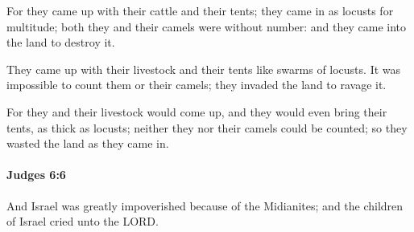 			\begin{versebox}
					\item[BHS] 
					\item[ASV] For they came up with their cattle and their tents; they came in as locusts for multitude; both they and their camels were without number: and they came into the land to destroy it.
					\item[NIV] They came up with their livestock and their tents like swarms of locusts. It was impossible to count them or their camels; they invaded the land to ravage it.
					\item[NRSV] For they and their livestock would come up, and they would even bring their tents, as thick as locusts; neither they nor their camels could be counted; so they wasted the land as they came in.
			\end{versebox}

		\paragraph{Judges 6:6} %
			\label{JUDGES-6-6}

			And Israel was greatly impoverished because of the Midianites; and the children of Israel cried unto the LORD.

